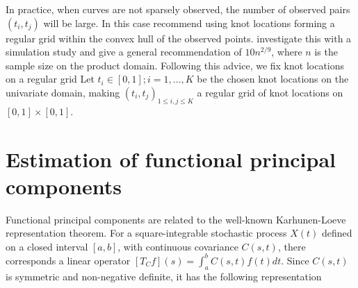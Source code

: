 In practice, when curves are not sparsely observed, the number of observed pairs $(t_i, t_j)$ will be large. In this case \cite{CFZ} recommend using knot locations forming a regular grid within the convex hull of the observed points. \cite{Kim:2004tt} investigate this with a simulation study and give a general recommendation of $10n^{2/9}$, where $n$ is the sample size on the product domain. Following this advice, we fix knot locations on a regular grid Let $t_i \in [0,1]; i=1,\dots, K$ be the chosen knot locations on the univariate domain, making $(t_i,t_j)_{1\leq i,j \leq K}$ a regular grid of knot locations on $[0,1]\times[0,1]$.

\section{Estimation of functional principal components} 

\label{sec:estimation_of_functional_principal_components}

Functional principal components are related to the well-known Karhunen-Loeve representation theorem. For a square-integrable stochastic process $X(t)$ defined on a closed interval $[a,b]$, with continuous covariance $C(s,t)$, there corresponds a linear operator $[T_Cf](s) = \int_a^bC(s,t)f(t)dt$. Since $C(s,t)$ is symmetric and non-negative definite, it has the following representation 

